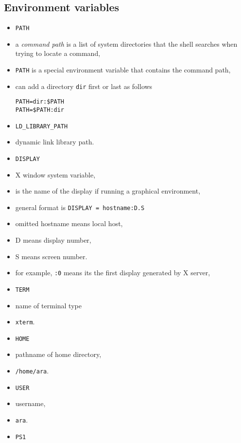 \documentclass[twocolumn]{IEEEtran} %
\begin{document}
\subsection{Environment variables}
\begin{itemize}
    \item \verb|PATH|
    \bi
        \item a \emph{command path} is a list of system directories that the shell searches when trying to locate a command,
        \item \verb|PATH| is a special environment variable that contains the command path,
        \item can add a directory \verb|dir| first or last as follows
        \begin{verbatim}
PATH=dir:$PATH
PATH=$PATH:dir
        \end{verbatim}
    \ei
    \item  \verb|LD_LIBRARY_PATH|
    \bi
        \item dynamic link library path.
    \ei
    \item \verb|DISPLAY|
    \bi
        \item X window system variable,
        \item is the name of the display if running a graphical environment,
        \item general format is \newline \verb|DISPLAY = hostname:D.S|
        \bi
            \item omitted hostname means local host,
            \item D means display number,
            \item S means screen number.
        \ei
        \item for example, \verb|:0| means its the first display generated by X server,
    \ei
    \item \verb|TERM|
    \bi
        \item name of terminal type
        \item \verb|xterm|.
    \ei
    \item \verb|HOME|
    \bi
        \item pathname of home directory,
    	\item \verb|/home/ara|.
    \ei
    \item \verb|USER|
    \bi
        \item username,
        \item \verb|ara|.
    \ei
    \item \verb|PS1|

\end{itemize}
\end{document}
